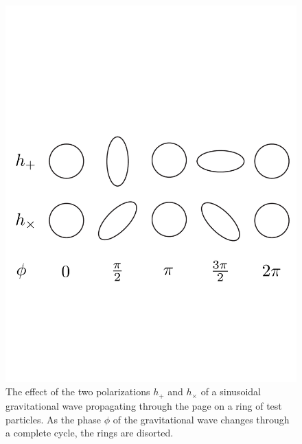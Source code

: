 \begin{figure}[p]
\label{f:rings}
\begin{center}
\includegraphics[width=\linewidth]{figures/inspiral/rings}
\end{center}
\caption[Effect of a Gravitational Wave Polarizations on a Ring of Particles]{%
The effect of the two polarizations $h_+$ and $h_\times$ of a sinusoidal
gravitational wave propagating through the page on a ring of test particles.
As the phase $\phi$ of the gravitational wave changes through a complete
cycle, the rings are disorted.
}
\end{figure}

